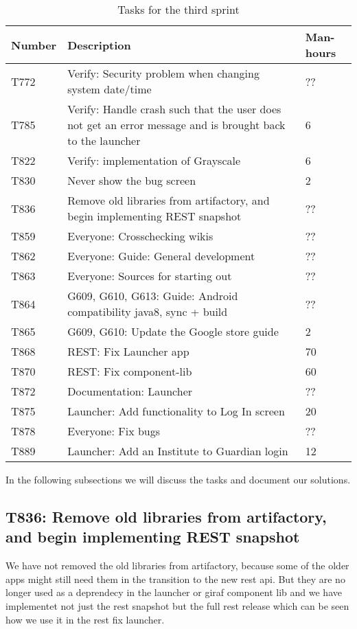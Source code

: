 \begin{table}[H]
\begin{centering}
\begin{tabular}{|l|p{9cm}|l|}
\hline
Number 	& Description & Man-hours \\ \hline
T772    & Verify: Security problem when changing system date/time & ??\\\hline
T785	& Verify: Handle crash such that the user does not get an error message and
is brought back to the launcher & 6\\ \hline
T822    & Verify: implementation of Grayscale & 6\\\hline
T830    & Never show the bug screen & 2 \\\hline
T836	& Remove old libraries from artifactory, and begin implementing REST
snapshot & ??\\\hline
T859   	& Everyone: Crosschecking wikis & ??\\\hline
T862  	& Everyone: Guide: General development & ?? \\ \hline
T863	& Everyone: Sources for starting out & ??\\ \hline
T864	& G609, G610, G613: Guide: Android compatibility java8, sync + build & ??\\
\hline 
T865	& G609, G610: Update the Google store guide & 2\\\hline
T868    & REST: Fix Launcher app & 70 \\\hline
T870    & REST: Fix component-lib & 60\\\hline
T872 	& Documentation: Launcher & ??\\ \hline
T875 	& Launcher: Add functionality to Log In screen & 20\\\hline 
T878 	& Everyone: Fix bugs & ??\\ \hline
T889	& Launcher: Add an Institute to Guardian login & 12 \\\hline
\end{tabular}
\caption{Tasks for the third sprint}
\label{Tasks3}
\end{centering}
\end{table}

In the following subsections we will discuss the tasks and document our
solutions.

\subsection{T836: Remove old libraries from artifactory, and begin implementing REST
snapshot}
We have not removed the old libraries from artifactory, because some of the
older apps might still need them in the transition to the new rest api. But they
are no longer used as a deprendecy in the launcher or giraf component lib and we
have implementet not just the rest snapshot but the full rest release which can
be seen how we use it in the rest fix launcher.


